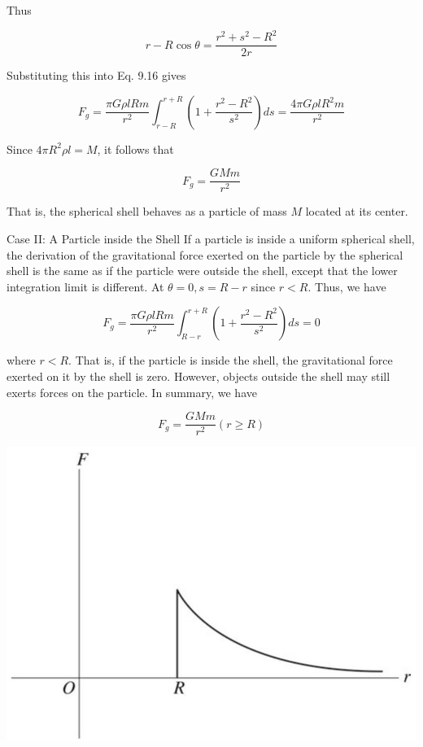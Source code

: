 \documentclass[10pt]{article}
\begin{document}
Thus

$$
r-R \cos \theta=\frac{r^{2}+s^{2}-R^{2}}{2 r}
$$

Substituting this into Eq. 9.16 gives


\begin{equation*}
F_{g}=\frac{\pi G \rho l R m}{r^{2}} \int_{r-R}^{r+R}\left(1+\frac{r^{2}-R^{2}}{s^{2}}\right) d s=\frac{4 \pi G \rho l R^{2} m}{r^{2}} \tag{9.17}
\end{equation*}


Since $4 \pi R^{2} \rho l=M$, it follows that

$$
F_{g}=\frac{G M m}{r^{2}}
$$

That is, the spherical shell behaves as a particle of mass $M$ located at its center.

Case II: A Particle inside the Shell If a particle is inside a uniform spherical shell, the derivation of the gravitational force exerted on the particle by the spherical shell is the same as if the particle were outside the shell, except that the lower integration limit is different. At $\theta=0, s=R-r$ since $r<R$. Thus, we have

$$
F_{g}=\frac{\pi G \rho l R m}{r^{2}} \int_{R-r}^{r+R}\left(1+\frac{r^{2}-R^{2}}{s^{2}}\right) d s=0
$$

where $r<R$. That is, if the particle is inside the shell, the gravitational force exerted on it by the shell is zero. However, objects outside the shell may still exerts forces on the particle. In summary, we have

$$
F_{g}=\frac{G M m}{r^{2}}(r \geq R)
$$

\begin{center}
\includegraphics[max width=\textwidth]{2024_09_13_db1f357d2aad0a03eb2eg-147}
\end{center}
\end{document}
